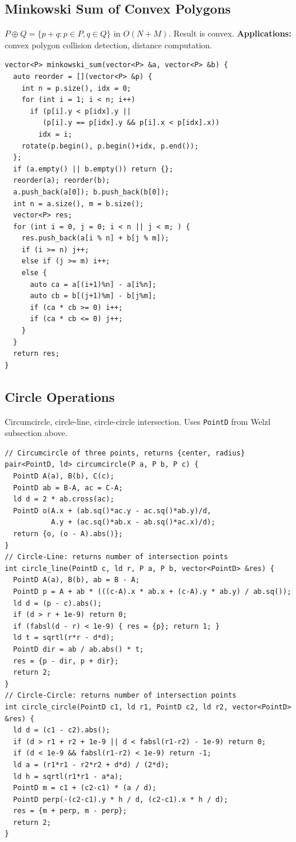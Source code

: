 \subsection{Minkowski Sum of Convex Polygons}
$P \oplus Q = \{p+q : p \in P, q \in Q\}$ in $O(N+M)$. Result is convex.
\textbf{Applications:} convex polygon collision detection, distance computation.
\begin{verbatim}
vector<P> minkowski_sum(vector<P> &a, vector<P> &b) {
  auto reorder = [](vector<P> &p) {
    int n = p.size(), idx = 0;
    for (int i = 1; i < n; i++)
      if (p[i].y < p[idx].y ||
         (p[i].y == p[idx].y && p[i].x < p[idx].x))
        idx = i;
    rotate(p.begin(), p.begin()+idx, p.end());
  };
  if (a.empty() || b.empty()) return {};
  reorder(a); reorder(b);
  a.push_back(a[0]); b.push_back(b[0]);
  int n = a.size(), m = b.size();
  vector<P> res;
  for (int i = 0, j = 0; i < n || j < m; ) {
    res.push_back(a[i % n] + b[j % m]);
    if (i >= n) j++;
    else if (j >= m) i++;
    else {
      auto ca = a[(i+1)%n] - a[i%n];
      auto cb = b[(j+1)%m] - b[j%m];
      if (ca * cb >= 0) i++;
      if (ca * cb <= 0) j++;
    }
  }
  return res;
}
\end{verbatim}

\subsection{Circle Operations}
Circumcircle, circle-line, circle-circle intersection. Uses \texttt{PointD} from Welzl subsection above.
\begin{verbatim}
// Circumcircle of three points, returns {center, radius}
pair<PointD, ld> circumcircle(P a, P b, P c) {
  PointD A(a), B(b), C(c);
  PointD ab = B-A, ac = C-A;
  ld d = 2 * ab.cross(ac);
  PointD o(A.x + (ab.sq()*ac.y - ac.sq()*ab.y)/d,
           A.y + (ac.sq()*ab.x - ab.sq()*ac.x)/d);
  return {o, (o - A).abs()};
}
// Circle-Line: returns number of intersection points
int circle_line(PointD c, ld r, P a, P b, vector<PointD> &res) {
  PointD A(a), B(b), ab = B - A;
  PointD p = A + ab * (((c-A).x * ab.x + (c-A).y * ab.y) / ab.sq());
  ld d = (p - c).abs();
  if (d > r + 1e-9) return 0;
  if (fabsl(d - r) < 1e-9) { res = {p}; return 1; }
  ld t = sqrtl(r*r - d*d);
  PointD dir = ab / ab.abs() * t;
  res = {p - dir, p + dir};
  return 2;
}
// Circle-Circle: returns number of intersection points
int circle_circle(PointD c1, ld r1, PointD c2, ld r2, vector<PointD> &res) {
  ld d = (c1 - c2).abs();
  if (d > r1 + r2 + 1e-9 || d < fabsl(r1-r2) - 1e-9) return 0;
  if (d < 1e-9 && fabsl(r1-r2) < 1e-9) return -1;
  ld a = (r1*r1 - r2*r2 + d*d) / (2*d);
  ld h = sqrtl(r1*r1 - a*a);
  PointD m = c1 + (c2-c1) * (a / d);
  PointD perp(-(c2-c1).y * h / d, (c2-c1).x * h / d);
  res = {m + perp, m - perp};
  return 2;
}
\end{verbatim}

